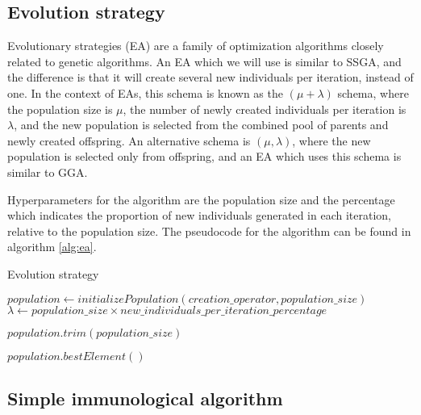 \subsection{Evolution strategy}
\label{sec:es}
Evolutionary strategies (EA) are a family of optimization algorithms closely related to genetic algorithms. An EA which we will use is similar to SSGA, and the difference is that it will create several new individuals per iteration, instead of one. In the context of EAs, this schema is known as the $(\mu + \lambda)$ schema, where the population size is $\mu$, the number of newly created individuals per iteration is $\lambda$, and the new population is selected from the combined pool of parents and newly created offspring. An alternative schema is $(\mu, \lambda)$, where the new population is selected only from offspring, and an EA which uses this schema is similar to GGA.

Hyperparameters for the algorithm are the population size and the percentage which indicates the proportion of new individuals generated in each iteration, relative to the population size. The pseudocode for the algorithm can be found in algorithm \ref{alg:ea}.

\begin{algorithm}[!htbp]
    \caption{Evolution strategy}
    \label{alg:ea}

    $population \gets initializePopulation(creation\_operator, population\_size)$\;
    $\lambda \gets population\_size \times new\_individuals\_per\_iteration\_percentage$\;

     {
        $population.trim(population\_size)$\;
    }

    \Return $population.bestElement()$\;
    \end{algorithm}

\subsection{Simple immunological algorithm}
\label{sec:sia}

